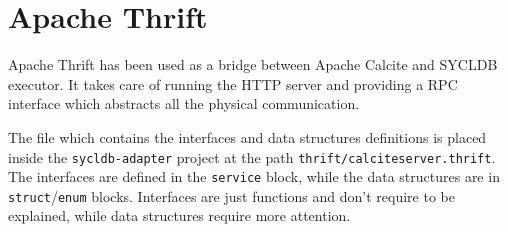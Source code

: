 \documentclass[a4paper, 10pt]{article}
\begin{document}
\section{Apache Thrift}

Apache Thrift has been used as a bridge between Apache Calcite and SYCLDB executor. It takes care of running the HTTP server and providing a RPC interface which abstracts all the physical communication.

The file which contains the interfaces and data structures definitions is placed inside the \texttt{sycldb-adapter} project at the path \texttt{thrift/calciteserver.thrift}. The interfaces are defined in the \texttt{service} block, while the data structures are in \texttt{struct}/\texttt{enum} blocks. Interfaces are just functions and don't require to be explained, while data structures require more attention.
\end{document}
